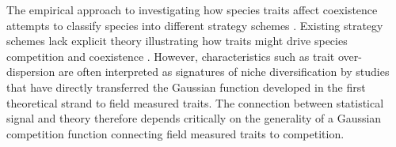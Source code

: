 \documentclass[a4paper,11pt]{article}
\begin{document}
The empirical approach to investigating how species traits affect
coexistence attempts to classify species into different strategy
schemes
\citep{Grime-1974,Grime-1979,Southwood-1977,Weiher-1999,Westoby-2002}.
%
%
Existing strategy schemes lack explicit theory illustrating how traits
might drive species competition and coexistence \citep{Adler-2013}.
However, characteristics such as trait over-dispersion are often
interpreted as
signatures of niche diversification \citep[e.g.][]{Kraft-2008} by
 studies that have directly transferred the Gaussian function developed in the
first theoretical strand to field measured traits.
The connection between statistical signal and theory therefore depends
critically on the generality of a Gaussian competition function
connecting field measured traits to competition.
\end{document}
